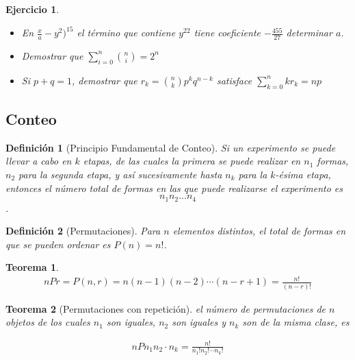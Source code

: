 \documentclass[12pt,twoside]{article}
\newtheorem{Def}{Definici\'on}
\newtheorem{Teo}{Teorema}
\newtheorem{Ejer}{Ejercicio}
\begin{document}
\begin{Ejer}
\begin{itemize}
\item[xv) ] En $\frac{x}{a}-y^2)^{15}$ el t\'ermino que contiene $y^{22}$ tiene coeficiente $-\frac{455}{27}$ determinar $a$.

\item[ixv) ] Demostrar que $\sum_{i=0}^{n}\binom{n}{i}=2^n$

\item[xvii) ] Si $p+q=1$, demostrar que $r_k=\binom{n}{k}p^kq^{n-k}$ satisface $\sum_{k=0}^{n}kr_k=np$

\end{itemize}

\end{Ejer}

\subsection{Conteo}

\begin{Def}[Principio Fundamental de Conteo]
Si un experimento se puede llevar a cabo en $k$ etapas, de las cuales la primera se puede realizar en $n_1$ formas,  $n_2$ para la segunda etapa, y as\'i sucesivamente hasta $n_k$ para la $k$-\'esima etapa,  entonces el n\'umero total de formas en las que puede realizarse el experimento es $$n_{1}n_{2}\dots n_{4}$$.

\end{Def}


\begin{Def}[Permutaciones]
Para $n$ elementos distintos,  el total de formas 	en que se pueden ordenar es $P(n)=n!$.

\end{Def}


\begin{Teo}
\begin{eqnarray}
nPr=P\left(n,r\right)=n\left(n-1\right)\left(n-2\right)\cdots\left(n-r+1\right)=\frac{n!}{\left(n-r\right)!}
\end{eqnarray}
\end{Teo}

\begin{Teo}[Permutaciones con repetici\'on]
el n\'umero de permutaciones de $n$ objetos de los cuales $n_{1}$ son iguales, $n_{2}$ son iguales y $n_{k}$ son de la misma clase, es

\begin{eqnarray}
nPn_{1}n_{2}\cdot n_{k}=\frac{n!}{n_{1}!n_{2}!\cdots n_{k}!}
\end{eqnarray}

\end{Teo}
\end{document}
